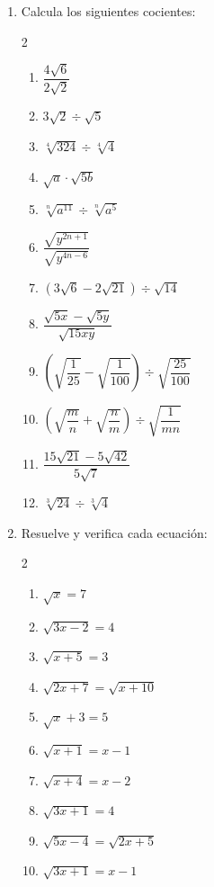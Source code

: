 \documentclass[11pt, letterpaper]{article}
\begin{document}
\begin{enumerate}[label=\textbf{\arabic*.}, leftmargin=*]
  \item Calcula los siguientes cocientes:
  \begin{multicols}{2}
  \begin{enumerate}[label=\alph*)]
    \item $\dfrac{4\sqrt{6}}{2\sqrt{2}}$
    \item $3\sqrt{2}\div\sqrt{5}$
    \item $\sqrt[4]{324}\div\sqrt[4]{4}$
    \item $\sqrt{a}\cdot\sqrt{5b}$
    \item $\sqrt[n]{a^{11}}\div\sqrt[n]{a^5}$
    \item $\dfrac{\sqrt{y^{2n+1}}}{\sqrt{y^{4n-6}}}$
    \item $(3\sqrt{6}-2\sqrt{21})\div\sqrt{14}$
    \item $\dfrac{\sqrt{5x}-\sqrt{5y}}{\sqrt{15xy}}$
    \item $\left(\sqrt{\dfrac{1}{25}}-\sqrt{\dfrac{1}{100}}\right)\div\sqrt{\dfrac{25}{100}}$
    \item $\left(\sqrt{\dfrac{m}{n}}+\sqrt{\dfrac{n}{m}}\right)\div\sqrt{\dfrac{1}{mn}}$
    \item $\dfrac{15\sqrt{21}-5\sqrt{42}}{5\sqrt{7}}$
    \item $\sqrt[3]{24}\div\sqrt[3]{4}$
  \end{enumerate}
  \end{multicols}

  \item Resuelve y verifica cada ecuación:
  \begin{multicols}{2}
  \begin{enumerate}[label=\alph*)]
    \item $\sqrt{x}=7$
    \item $\sqrt{3x-2}=4$
    \item $\sqrt{x+5}=3$
    \item $\sqrt{2x+7}=\sqrt{x+10}$
    \item $\sqrt{x}+3=5$
    \item $\sqrt{x+1}=x-1$
    \item $\sqrt{x+4}=x-2$
    \item $\sqrt{3x+1}=4$
    \item $\sqrt{5x-4}=\sqrt{2x+5}$
    \item $\sqrt{3x+1}=x-1$
  \end{enumerate}
  \end{multicols}
\end{enumerate}
\end{document}
